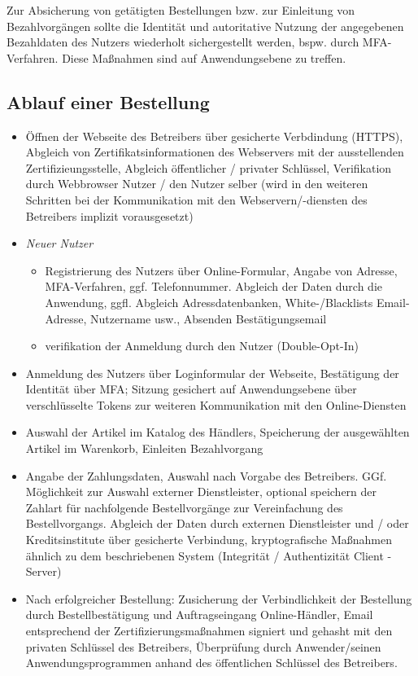 \noindent
Zur Absicherung von getätigten Bestellungen bzw. zur Einleitung von Bezahlvorgängen sollte die Identität und autoritative Nutzung der angegebenen Bezahldaten des Nutzers wiederholt sichergestellt werden, bspw. durch MFA-Verfahren.
Diese Maßnahmen sind auf Anwendungsebene zu treffen.

\subsection{Ablauf einer Bestellung}


\begin{itemize}
    \itemsep0.5em
    \item Öffnen der Webseite des Betreibers über gesicherte Verbdindung (HTTPS), Abgleich von Zertifikatsinformationen des Webservers mit der ausstellenden Zertifizieungsstelle, Abgleich öffentlicher / privater Schlüssel, Verifikation durch Webbrowser Nutzer / den Nutzer selber (wird in den weiteren Schritten bei der Kommunikation mit den Webservern/-diensten des Betreibers implizit vorausgesetzt)
    \item \textit{Neuer Nutzer}
    \begin{itemize}
        \item Registrierung des Nutzers über Online-Formular, Angabe von Adresse, MFA-Verfahren, ggf. Telefonnummer. Abgleich der Daten durch die Anwendung, ggfl. Abgleich Adressdatenbanken, White-/Blacklists Email-Adresse, Nutzername usw., Absenden Bestätigungsemail
        \item verifikation der Anmeldung durch den Nutzer (Double-Opt-In)
    \end{itemize}
    \item Anmeldung des Nutzers über Loginformular der Webseite, Bestätigung der Identität über MFA; Sitzung gesichert auf Anwendungsebene über verschlüsselte Tokens zur weiteren Kommunikation mit den Online-Diensten
    \item Auswahl der Artikel im Katalog des Händlers, Speicherung der ausgewählten Artikel im Warenkorb, Einleiten Bezahlvorgang
    \item Angabe der Zahlungsdaten, Auswahl nach Vorgabe des Betreibers. GGf. Möglichkeit zur Auswahl externer Dienstleister, optional speichern der Zahlart für nachfolgende Bestellvorgänge zur Vereinfachung des Bestellvorgangs. Abgleich der Daten durch externen Dienstleister und / oder Kreditsinstitute über gesicherte Verbindung, kryptografische Maßnahmen ähnlich zu dem beschriebenen System (Integrität / Authentizität Client - Server)
    \item Nach erfolgreicher Bestellung: Zusicherung der Verbindlichkeit der Bestellung durch Bestellbestätigung und Auftragseingang Online-Händler, Email entsprechend der Zertifizierungsmaßnahmen signiert und gehasht mit den privaten Schlüssel des Betreibers, Überprüfung durch Anwender/seinen Anwendungsprogrammen anhand des öffentlichen Schlüssel des Betreibers.
\end{itemize}